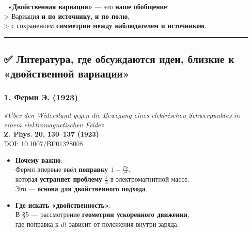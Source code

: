 \documentclass[11pt]{article}
\begin{document}
📌 \textbf{«Двойственная вариация»} --- это \textbf{наше обобщение}:\\
\textgreater{} Вариация \textbf{и по источнику, и по полю},\\
\textgreater{} с сохранением \textbf{симметрии между наблюдателем и
источником}.

\begin{center}\rule{0.5\linewidth}{\linethickness}\end{center}

\subsection{✅ Литература, где обсуждаются идеи, близкие к «двойственной
вариации»}\label{ux43bux438ux442ux435ux440ux430ux442ux443ux440ux430-ux433ux434ux435-ux43eux431ux441ux443ux436ux434ux430ux44eux442ux441ux44f-ux438ux434ux435ux438-ux431ux43bux438ux437ux43aux438ux435-ux43a-ux434ux432ux43eux439ux441ux442ux432ux435ux43dux43dux43eux439-ux432ux430ux440ux438ux430ux446ux438ux438}

\subsubsection{\texorpdfstring{1. \textbf{Ферми Э.
(1923)}}{1. Ферми Э. (1923)}}\label{ux444ux435ux440ux43cux438-ux44d.-1923}

\emph{«Über den Widerstand gegen die Bewegung eines elektrischen
Schwerpunktes in einem elektromagnetischen Felde»}\\
\textbf{Z. Phys. 20, 130--137 (1923)}\\
\href{https://doi.org/10.1007/BF01328008}{DOI: 10.1007/BF01328008}

\begin{itemize}
\item
  \textbf{Почему важно}:\\
  Ферми впервые ввёл \textbf{поправку \(1 + \frac{\Gamma x}{c^2}\)},\\
  которая \textbf{устраняет проблему \(\frac{4}{3}\)} в электромагнитной
  массе.\\
  Это --- \textbf{основа для двойственного подхода}.
\item
  \textbf{Где искать «двойственность»}:\\
  В §5 --- рассмотрение \textbf{геометрии ускоренного движения},\\
  где поправка к \(dt\) зависит от положения внутри заряда.
\end{itemize}
\end{document}
